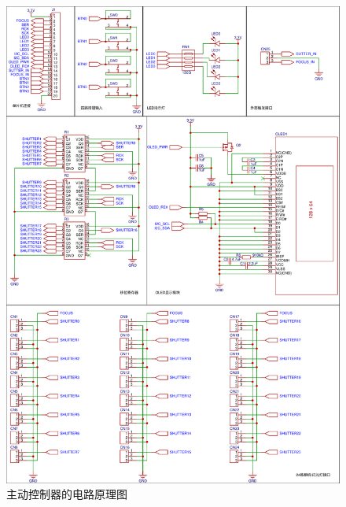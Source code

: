 \begin{figure}[p]
    \centering
    \includegraphics[width=\textwidth]{figures/active_sync_schematic}
    \caption{主动控制器的电路原理图}
    \label{fig:active_sync_schematic}
\end{figure}
